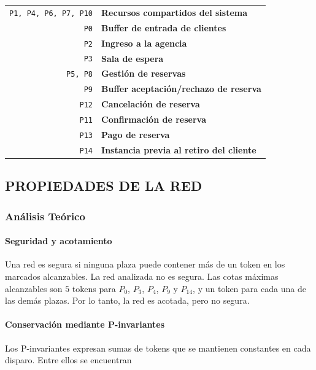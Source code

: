 \documentclass[11pt,a4paper]{article}
\begin{document}
\begin{table}[H]
    \centering
    \begin{tabular}{rl}
        \texttt{P1, P4, P6, P7, P10}& \textbf{Recursos compartidos del sistema} \\
        \texttt{P0}& \textbf{Buffer de entrada de clientes} \\
        \texttt{P2}& \textbf{Ingreso a la agencia} \\
        \texttt{P3}& \textbf{Sala de espera} \\
        \texttt{P5, P8}& \textbf{Gestión de reservas} \\
        \texttt{P9}& \textbf{Buffer aceptación/rechazo de reserva} \\
        \texttt{P12}& \textbf{Cancelación de reserva} \\
        \texttt{P11}& \textbf{Confirmación de reserva} \\
        \texttt{P13}& \textbf{Pago de reserva} \\
        \texttt{P14}& \textbf{Instancia previa al retiro del cliente}
    \end{tabular}
\end{table}

\subsection{PROPIEDADES DE LA RED}

\subsubsection{Análisis Teórico}

\paragraph{Seguridad y acotamiento}

Una red es segura si ninguna plaza puede contener más de un token en los
marcados alcanzables. La red analizada no es segura. Las cotas máximas
alcanzables son $5$ tokens para $P_0$, $P_3$, $P_4$, $P_9$ y $P_{14}$, y un
token para cada una de las demás plazas. Por lo tanto, la red es acotada, pero
no segura.


\paragraph{Conservación mediante P-invariantes}

Los P-invariantes expresan sumas de tokens que se mantienen constantes en cada
disparo. Entre ellos se encuentran
\end{document}
